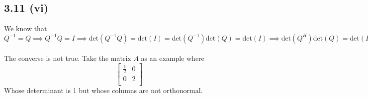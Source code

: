 \documentclass[letterpaper,12pt]{article}
\theoremstyle{definition}
\begin{document}
\subsection*{3.11 (vi)}
We know that $Q^{-1} = Q \implies Q^{-1}Q = I \implies \text{det}(Q^{-1}Q) = \text{det}(I) = \text{det}(Q^{-1}) \text{det}(Q) = \text{det}(I) \implies \text{det}(Q^H) \text{det}(Q) = \text{det}(I)\implies \text{det}(Q) \text{det}(Q) = 1 \implies \text{det}(Q) = \pm 1 \implies |\text{det}(Q) | = 1$
\\\\The converse is not true. Take the matrix $A$ as an example where
\[
\begin{bmatrix}
    \frac{1}{2}&0 \\
    0&2 \\
\end{bmatrix}
\]
Whose determinant is 1 but whose columns are not orthonormal.
\end{document}
